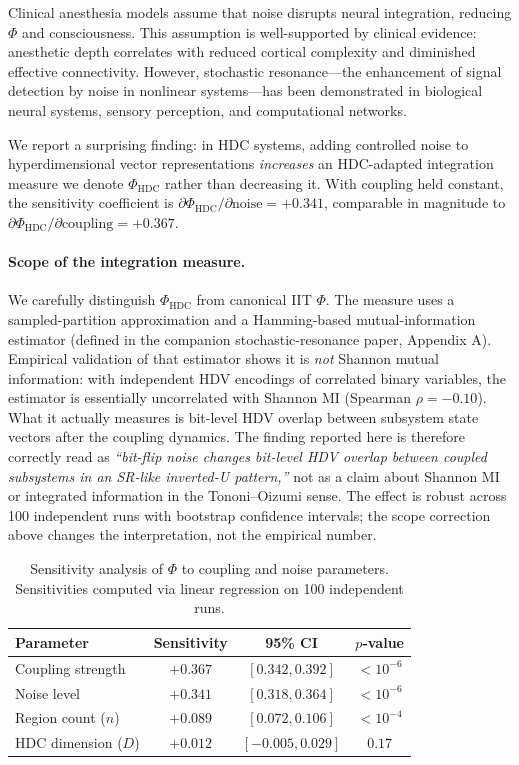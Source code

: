 \documentclass[12pt]{book}
\begin{document}
Clinical anesthesia models assume that noise disrupts neural integration, reducing $\Phi$ and consciousness. This assumption is well-supported by clinical evidence: anesthetic depth correlates with reduced cortical complexity and diminished effective connectivity. However, stochastic resonance---the enhancement of signal detection by noise in nonlinear systems---has been demonstrated in biological neural systems, sensory perception, and computational networks.

We report a surprising finding: in HDC systems, adding controlled noise to hyperdimensional vector representations \textit{increases} an HDC-adapted integration measure we denote $\Phi_{\text{HDC}}$ rather than decreasing it. With coupling held constant, the sensitivity coefficient is $\partial\Phi_{\text{HDC}}/\partial\text{noise} = +0.341$, comparable in magnitude to $\partial\Phi_{\text{HDC}}/\partial\text{coupling} = +0.367$.

\paragraph{Scope of the integration measure.} We carefully distinguish $\Phi_{\text{HDC}}$ from canonical IIT $\Phi$. The measure uses a sampled-partition approximation and a Hamming-based mutual-information estimator (defined in the companion stochastic-resonance paper, Appendix A). Empirical validation of that estimator shows it is \emph{not} Shannon mutual information: with independent HDV encodings of correlated binary variables, the estimator is essentially uncorrelated with Shannon MI (Spearman $\rho = -0.10$). What it actually measures is bit-level HDV overlap between subsystem state vectors after the coupling dynamics. The finding reported here is therefore correctly read as \emph{``bit-flip noise changes bit-level HDV overlap between coupled subsystems in an SR-like inverted-U pattern,''} not as a claim about Shannon MI or integrated information in the Tononi--Oizumi sense. The effect is robust across 100 independent runs with bootstrap confidence intervals; the scope correction above changes the interpretation, not the empirical number.

\begin{table}[H]
\centering
\caption{Sensitivity analysis of $\Phi$ to coupling and noise parameters. Sensitivities computed via linear regression on 100 independent runs.}
\label{tab:sensitivity}
\begin{tabular}{lccc}
\toprule
\textbf{Parameter} & \textbf{Sensitivity} & \textbf{95\% CI} & \textbf{$p$-value} \\
\midrule
Coupling strength & $+0.367$ & $[0.342, 0.392]$ & $< 10^{-6}$ \\
Noise level & $+0.341$ & $[0.318, 0.364]$ & $< 10^{-6}$ \\
Region count ($n$) & $+0.089$ & $[0.072, 0.106]$ & $< 10^{-4}$ \\
HDC dimension ($D$) & $+0.012$ & $[-0.005, 0.029]$ & $0.17$ \\
\bottomrule
\end{tabular}
\end{table}
\end{document}
